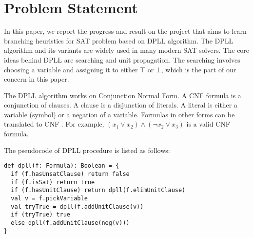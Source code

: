 \documentclass[sigplan,10pt]{acmart}\settopmatter{printfolios=true,printccs=false,printacmref=false}
\begin{document}


\maketitle

\renewcommand\thefootnotecopyrightpermission{}

\section{Problem Statement}

In this paper, we report the progress and result on the project that aims to learn branching heuristics 
for SAT problem based on DPLL algorithm. The DPLL algorithm \cite{Davis:1962:MPT:368273.368557} and its 
variants are widely used in many modern SAT solvers. 
The core ideas behind DPLL are searching and unit propagation. 
The searching involves choosing a variable and assigning it to either $\top$ or $\bot$, 
which is the part of our concern in this paper.

The DPLL algorithm works on Conjunction Normal Form. A CNF formula is a conjunction of clauses. A clause is a disjunction of literals. A literal is either a variable (symbol) or a negation of a variable. Formulas in other forms can be translated to CNF \cite{tseitin1983complexity}. For example, $(x_1 \vee x_2) \wedge (\neg x_2 \vee x_3)$ is a valid CNF formula.

The pseudocode of DPLL procedure is listed as follows:

\begin{lstlisting}
def dpll(f: Formula): Boolean = {
  if (f.hasUnsatClause) return false
  if (f.isSat) return true
  if (f.hasUnitClause) return dpll(f.elimUnitClause)
  val v = f.pickVariable
  val tryTrue = dpll(f.addUnitClause(v))
  if (tryTrue) true
  else dpll(f.addUnitClause(neg(v)))
}
\end{lstlisting}
\end{document}
